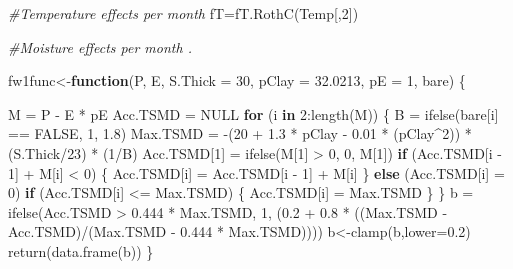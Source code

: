 \documentclass[
  10pt,
  b5paper,
]{book}
\newenvironment{Shaded}{\begin{snugshade}}{\end{snugshade}}
\newcommand{\AttributeTok}[1]{\textcolor[rgb]{0.77,0.63,0.00}{#1}}
\newcommand{\CommentTok}[1]{\textcolor[rgb]{0.56,0.35,0.01}{\textit{#1}}}
\newcommand{\ConstantTok}[1]{\textcolor[rgb]{0.00,0.00,0.00}{#1}}
\newcommand{\ControlFlowTok}[1]{\textcolor[rgb]{0.13,0.29,0.53}{\textbf{#1}}}
\newcommand{\DecValTok}[1]{\textcolor[rgb]{0.00,0.00,0.81}{#1}}
\newcommand{\FloatTok}[1]{\textcolor[rgb]{0.00,0.00,0.81}{#1}}
\newcommand{\FunctionTok}[1]{\textcolor[rgb]{0.00,0.00,0.00}{#1}}
\newcommand{\NormalTok}[1]{#1}
\newcommand{\OtherTok}[1]{\textcolor[rgb]{0.56,0.35,0.01}{#1}}
\newcommand{\SpecialCharTok}[1]{\textcolor[rgb]{0.00,0.00,0.00}{#1}}
\begin{document}
\begin{Shaded}
\begin{Highlighting}[]
\CommentTok{\#Temperature effects per month}
\NormalTok{fT}\OtherTok{=}\FunctionTok{fT.RothC}\NormalTok{(Temp[,}\DecValTok{2}\NormalTok{]) }

\CommentTok{\#Moisture effects per month . }

\NormalTok{fw1func}\OtherTok{\textless{}{-}}\ControlFlowTok{function}\NormalTok{(P, E, }\AttributeTok{S.Thick =} \DecValTok{30}\NormalTok{, }\AttributeTok{pClay =} \FloatTok{32.0213}\NormalTok{, }\AttributeTok{pE =} \DecValTok{1}\NormalTok{, bare) }
\NormalTok{\{}
   
\NormalTok{    M }\OtherTok{=}\NormalTok{ P }\SpecialCharTok{{-}}\NormalTok{ E }\SpecialCharTok{*}\NormalTok{ pE}
\NormalTok{    Acc.TSMD }\OtherTok{=} \ConstantTok{NULL}
    \ControlFlowTok{for}\NormalTok{ (i }\ControlFlowTok{in} \DecValTok{2}\SpecialCharTok{:}\FunctionTok{length}\NormalTok{(M)) \{}
\NormalTok{    B }\OtherTok{=} \FunctionTok{ifelse}\NormalTok{(bare[i] }\SpecialCharTok{==} \ConstantTok{FALSE}\NormalTok{, }\DecValTok{1}\NormalTok{, }\FloatTok{1.8}\NormalTok{)}
\NormalTok{     Max.TSMD }\OtherTok{=} \SpecialCharTok{{-}}\NormalTok{(}\DecValTok{20} \SpecialCharTok{+} \FloatTok{1.3} \SpecialCharTok{*}\NormalTok{ pClay }\SpecialCharTok{{-}} \FloatTok{0.01} \SpecialCharTok{*}\NormalTok{ (pClay}\SpecialCharTok{\^{}}\DecValTok{2}\NormalTok{)) }\SpecialCharTok{*}\NormalTok{ (S.Thick}\SpecialCharTok{/}\DecValTok{23}\NormalTok{) }\SpecialCharTok{*}\NormalTok{ (}\DecValTok{1}\SpecialCharTok{/}\NormalTok{B)}
\NormalTok{        Acc.TSMD[}\DecValTok{1}\NormalTok{] }\OtherTok{=} \FunctionTok{ifelse}\NormalTok{(M[}\DecValTok{1}\NormalTok{] }\SpecialCharTok{\textgreater{}} \DecValTok{0}\NormalTok{, }\DecValTok{0}\NormalTok{, M[}\DecValTok{1}\NormalTok{])}
        \ControlFlowTok{if}\NormalTok{ (Acc.TSMD[i }\SpecialCharTok{{-}} \DecValTok{1}\NormalTok{] }\SpecialCharTok{+}\NormalTok{ M[i] }\SpecialCharTok{\textless{}} \DecValTok{0}\NormalTok{) \{}
\NormalTok{            Acc.TSMD[i] }\OtherTok{=}\NormalTok{ Acc.TSMD[i }\SpecialCharTok{{-}} \DecValTok{1}\NormalTok{] }\SpecialCharTok{+}\NormalTok{ M[i]}
\NormalTok{        \}}
        \ControlFlowTok{else}\NormalTok{ (Acc.TSMD[i] }\OtherTok{=} \DecValTok{0}\NormalTok{)}
        \ControlFlowTok{if}\NormalTok{ (Acc.TSMD[i] }\SpecialCharTok{\textless{}=}\NormalTok{ Max.TSMD) \{}
\NormalTok{            Acc.TSMD[i] }\OtherTok{=}\NormalTok{ Max.TSMD}
\NormalTok{        \}}
\NormalTok{    \}}
\NormalTok{    b }\OtherTok{=} \FunctionTok{ifelse}\NormalTok{(Acc.TSMD }\SpecialCharTok{\textgreater{}} \FloatTok{0.444} \SpecialCharTok{*}\NormalTok{ Max.TSMD, }\DecValTok{1}\NormalTok{, (}\FloatTok{0.2} \SpecialCharTok{+} \FloatTok{0.8} \SpecialCharTok{*}\NormalTok{ ((Max.TSMD }\SpecialCharTok{{-}} 
\NormalTok{        Acc.TSMD)}\SpecialCharTok{/}\NormalTok{(Max.TSMD }\SpecialCharTok{{-}} \FloatTok{0.444} \SpecialCharTok{*}\NormalTok{ Max.TSMD))))}
\NormalTok{    b}\OtherTok{\textless{}{-}}\FunctionTok{clamp}\NormalTok{(b,}\AttributeTok{lower=}\FloatTok{0.2}\NormalTok{)}
    \FunctionTok{return}\NormalTok{(}\FunctionTok{data.frame}\NormalTok{(b))   }
\NormalTok{\}}


\end{Highlighting}
\end{Shaded}
\end{document}
